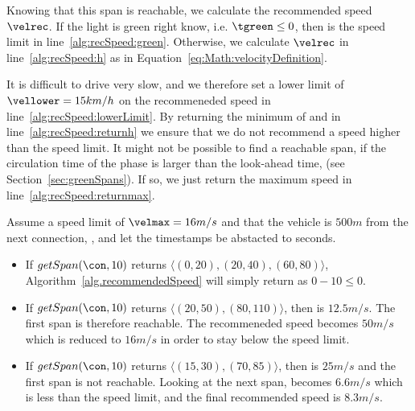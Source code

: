 Knowing that this span is reachable, we calculate the recommended speed $\velrec$.
If the light is green right know, i.e. $\tgreen \leq 0$, then \velrec is the speed limit in line~\ref{alg:recSpeed:green}. 
Otherwise, we calculate $\velrec$ in line~\ref{alg:recSpeed:h} as in Equation~\ref{eq:Math:velocityDefinition}.

It is difficult to drive very slow, and we therefore set a lower limit of $\vellower=15km/h$ on the recommeneded speed in line~\ref{alg:recSpeed:lowerLimit}. 
By returning the minimum of \velrec and \velmax in line~\ref{alg:recSpeed:returnh} we ensure that we do not recommend a speed higher than the speed limit.
It might not be possible to find a reachable span, if the circulation time of the phase is larger than the look-ahead time, \tmax (see Section~\ref{sec:greenSpans}).
If so, we just return the maximum speed in line~\ref{alg:recSpeed:returnmax}.

Assume a speed limit of $\velmax = 16 m/s$ and that the vehicle is $500 m$ from the next connection, \con, and let  the timestamps be abstacted to seconds.
\begin{itemize}
\item If $getSpan(\con, 10)$ returns $\langle(0,20), (20,40), (60,80)\rangle$, Algorithm~\ref{alg.recommendedSpeed} will simply return \velmax as $0-10 \leq 0$.
\item If $getSpan(\con, 10)$ returns $\langle(20,50), (80,110)\rangle$, then \velslow is $12.5 m/s$.
The first span is therefore reachable. 
The recommeneded speed becomes $50m/s$ which is reduced to $16 m/s$ in order to stay below the speed limit.
\item If $getSpan(\con, 10)$ returns $\langle(15,30), (70,85)\rangle$, then \velslow is $25 m/s$ and the first span is not reachable.
Looking at the next span, \velslow becomes $6.6m/s$ which is less than the speed limit, and the final recommended speed is $8.3 m/s$.
\end{itemize}

